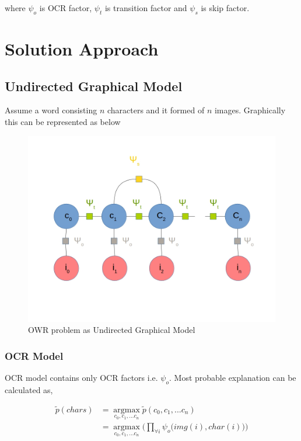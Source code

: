 \documentclass[paper=a4, fontsize=11pt]{scrartcl} %
\DeclareMathOperator*{\argmax}{argmax}
\newcommand*{\argmaxl}{\argmax\limits}
\numberwithin{equation}{section} %
\numberwithin{figure}{section} %
\numberwithin{table}{section} %
\begin{document}
where $\psi_o$ is OCR factor, $\psi_t$ is transition factor and $\psi_s$ is skip factor.

\section{Solution Approach}

\subsection{Undirected Graphical Model}
Assume a word consisting $n$ characters and it formed of $n$ images. Graphically this can be represented as below

\begin{figure}[!ht]
	\centering
		\includegraphics[scale=0.4]{model}
		\caption{OWR problem as Undirected Graphical Model}
\end{figure}

\subsubsection{OCR Model}

\par
OCR model contains only OCR factors i.e. $\psi_o$. Most probable explanation can be calculated as,

\begin{align*}
	\tilde{p}(chars) & = \argmaxl_{c_0,c_1,...c_n} \tilde{p}(c_0,c_1,...c_n) \\
					 & = \argmaxl_{c_0,c_1,...c_n} \bigg(\displaystyle \prod_{\forall i}^{}  \psi_{o}\big(img(i),char(i)\big) \bigg)\\
\end{align*}
\end{document}

